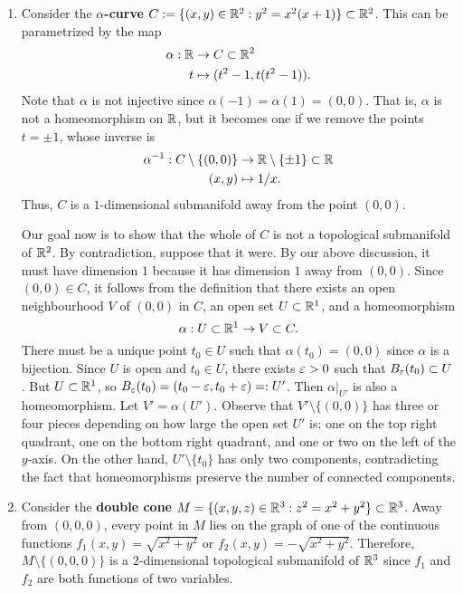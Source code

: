 \begin{enumerate}[(1)]
    \item Consider the {\bf $\alpha$-curve} $C := \{(x, y) \in \mathbb{R}^2 : y^2 = x^2(x+1)\} \subset \mathbb{R}^2$.
    This can be parametrized by the map 
    \begin{align*}
        \alpha : \mathbb{R} &\to C \subset \mathbb{R}^2 \\
        t &\mapsto (t^2 - 1, t(t^2 - 1)).
    \end{align*}
    Note that $\alpha$ is not injective since $\alpha(-1) = \alpha(1) = (0, 0)$.
    That is, $\alpha$ is not a homeomorphism on $\mathbb{R}$, but it becomes one 
    if we remove the points $t = \pm1$, whose inverse is 
    \begin{align*}
        \alpha^{-1} : C \setminus \{(0, 0)\} &\to \mathbb{R} \setminus \{\pm1\} \subset \mathbb{R} \\ 
        (x, y) &\mapsto 1/x. 
    \end{align*} 
    Thus, $C$ is a $1$-dimensional submanifold away from the point $(0, 0)$. 
    
    Our goal now is to show that the whole of $C$ is not a topological submanifold 
    of $\mathbb{R}^2$. By contradiction, suppose that it were. By our above discussion, 
    it must have dimension $1$ because it has dimension $1$ away from $(0, 0)$. 
    Since $(0, 0) \in C$, it follows from the definition that there exists an 
    open neighbourhood $V$ of $(0, 0)$ in $C$, 
    an open set $U \subset \mathbb{R}^1$, and a homeomorphism 
    \[ \alpha : U \subset \mathbb{R}^1 \to V \subset C. \] 
    There must be a unique point $t_0 \in U$ such that $\alpha(t_0) = (0, 0)$ 
    since $\alpha$ is a bijection. Since $U$ is open and $t_0 \in U$, there 
    exists $\varepsilon > 0$ such that $B_\varepsilon(t_0) \subset U$. But $U \subset \mathbb{R}^1$, 
    so $B_\varepsilon(t_0) = (t_0 - \varepsilon, t_0 + \varepsilon) =: U'$. Then $\alpha|_{U'}$ 
    is also a homeomorphism. Let $V' = \alpha(U')$. Observe that 
    $V' \setminus \{(0, 0)\}$ has three or four pieces depending on how large 
    the open set $U'$ is: one on the top right quadrant, one on the bottom right 
    quadrant, and one or two on the left of the $y$-axis. On the other hand, 
    $U' \setminus \{t_0\}$ has only two components, contradicting the fact that 
    homeomorphisms preserve the number of connected components. 

    \item Consider the {\bf double cone} $M = \{(x, y, z) \in \mathbb{R}^3 : 
    z^2 = x^2 + y^2\} \subset \mathbb{R}^3$. Away from $(0, 0, 0)$, every point in $M$ 
    lies on the graph of one of the continuous functions $f_1(x, y) =
    \sqrt{x^2+y^2}$ or $f_2(x, y) = -\sqrt{x^2 + y^2}$. Therefore, 
    $M \setminus \{(0, 0, 0)\}$ is a $2$-dimensional topological submanifold 
    of $\mathbb{R}^3$ since $f_1$ and $f_2$ are both functions of two variables. 


\end{enumerate}
